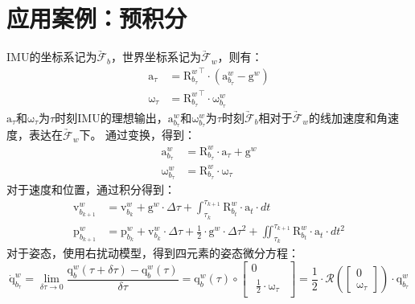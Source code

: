 \documentclass[12pt, onecolumn]{article}
\newcommand\normf{\fangsong}
\newcommand\bsm[1]{\boldsymbol{\mathrm{#1}}}
\newcommand\rotation[2]{{\bsm{R}_{#1}^{#2}}}
\newcommand\quaternion[2]{{\bsm{q}_{#1}^{#2}}}
\newcommand\angvel[2]{{\bsm{\omega}_{#1}^{#2}}}
\newcommand\translation[2]{{\bsm{p}_{#1}^{#2}}}
\newcommand\linvel[2]{{\bsm{v}_{#1}^{#2}}}
\newcommand\linacce[2]{{\bsm{a}_{#1}^{#2}}}
\newcommand\gravity[1]{{\bsm{g}^{#1}}}
\newcommand\coordframe[1]{\underrightarrow{\mathcal{F}}_{#1}}
\begin{document}
	\section{\normf 应用案例：预积分}
	\normf
		IMU的坐标系记为$\coordframe{b}$，世界坐标系记为$\coordframe{w}$，则有：
		\begin{equation}
		\begin{aligned}
		\bsm{a}_\tau&=\rotation{b_\tau}{w} ^\top\cdot\left(
		\linacce{b_\tau}{w}-\gravity{w}
		\right) 
		\\
		\bsm{\omega}_\tau&=\rotation{b_\tau}{w} ^\top\cdot\angvel{b_\tau}{w}
		\end{aligned}
		\end{equation}
		$\bsm{a}_\tau$和$\bsm{\omega}_\tau$为$\tau$时刻IMU的理想输出，$\linacce{b_\tau}{w}$和$\angvel{b_\tau}{w}$为$\tau$时刻$\coordframe{b}$相对于$\coordframe{w}$的线加速度和角速度，表达在$\coordframe{w}$下。
		通过变换，得到：
		\begin{equation}
		\begin{aligned}
		\linacce{b_\tau}{w}&=\rotation{b_\tau}{w} \cdot \bsm{a}_\tau+\gravity{w}
		\\
		\angvel{b_\tau}{w}&=\rotation{b_\tau}{w}\cdot\bsm{\omega}_\tau
		\end{aligned}
		\end{equation}
		对于速度和位置，通过积分得到：
		\begin{equation}
		\begin{aligned}
			\linvel{b_{k+1}}{w}&=\linvel{b_{k}}{w}+\gravity{w}\cdot\Delta\tau
			+\int_{\tau_{k}}^{\tau_{k+1}}
			\rotation{b_t}{w} \cdot \bsm{a}_t \cdot dt
			\\
			\translation{b_{k+1}}{w}&=\translation{b_{k}}{w}
			+\linvel{b_{k}}{w}\cdot\Delta\tau
			+\frac{1}{2}\cdot\gravity{w}\cdot\Delta\tau^2+\iint_{\tau_{k}}^{\tau_{k+1}}
			\rotation{b_t}{w} \cdot \bsm{a}_t \cdot dt^2
		\end{aligned}
		\end{equation}
		对于姿态，使用右扰动模型，得到四元素的姿态微分方程：
		\begin{equation}
		\dot{\bsm{q}}_{b_\tau}^{w}=\lim_{\delta \tau\to 0}\frac{\quaternion{b}{w}(\tau+\delta\tau)-\quaternion{b}{w}(\tau)}{\delta \tau}
		=\quaternion{b}{w}(\tau)\circ\begin{bmatrix}
		0\\
		\begin{aligned}
		\frac{1}{2}\cdot\bsm{\omega}_\tau
		\end{aligned}
		\end{bmatrix}
		=\frac{1}{2}\cdot\mathcal{R}\left(\begin{bmatrix}
				0\\
				\bsm{\omega}_\tau
				\end{bmatrix}\right) \cdot\quaternion{b_\tau}{w}
		\end{equation}
\end{document}
